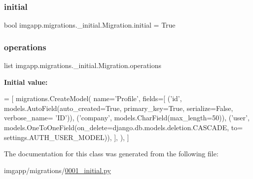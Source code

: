 \subsubsection{\texorpdfstring{initial}{initial}}
{\footnotesize\ttfamily bool imgapp.\+migrations.\+\_\+initial.\+Migration.\+initial = True\hspace{0.3cm}{\ttfamily [static]}}

\mbox{\label{classimgapp_1_1migrations_1_10001__initial_1_1Migration_ad2e7a56581e2741b53b78c4b28663ff6}} 
\subsubsection{\texorpdfstring{operations}{operations}}
{\footnotesize\ttfamily list imgapp.\+migrations.\+\_\+initial.\+Migration.\+operations\hspace{0.3cm}{\ttfamily [static]}}

{\bfseries Initial value\+:}
\begin{DoxyCode}
=  [
        migrations.CreateModel(
            name=\textcolor{stringliteral}{'Profile'},
            fields=[
                (\textcolor{stringliteral}{'id'}, models.AutoField(auto\_created=\textcolor{keyword}{True}, primary\_key=\textcolor{keyword}{True}, serialize=\textcolor{keyword}{False}, verbose\_name=\textcolor{stringliteral}{
      'ID'})),
                (\textcolor{stringliteral}{'company'}, models.CharField(max\_length=50)),
                (\textcolor{stringliteral}{'user'}, models.OneToOneField(on\_delete=django.db.models.deletion.CASCADE, to=
      settings.AUTH\_USER\_MODEL)),
            ],
        ),
    ]
\end{DoxyCode}


The documentation for this class was generated from the following file\+:\begin{DoxyCompactItemize}
\item 
imgapp/migrations/\hyperlink{0001__initial_8py}{0001\+\_\+initial.\+py}\end{DoxyCompactItemize}
